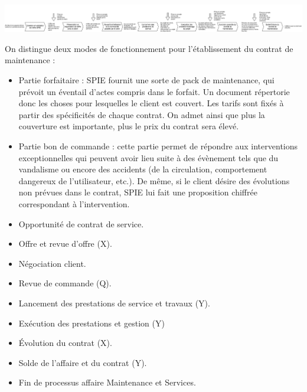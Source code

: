 \begin {center}
\includegraphics[width=\textwidth]{png/SimplificationProcessusDeMaintenanceSPIE.png}
\end {center}

On distingue deux modes de fonctionnement pour l’établissement du contrat de maintenance :

\begin{itemize}
\item Partie forfaitaire : SPIE fournit une sorte de pack de maintenance, qui prévoit un éventail d’actes compris dans le forfait. Un document répertorie donc les choses pour lesquelles le client est couvert. Les tarifs sont fixés à partir des spécificités de chaque contrat. On admet ainsi que plus la couverture est importante, plus le prix du contrat sera élevé. 
\item Partie bon de commande : cette partie permet de répondre aux interventions exceptionnelles qui peuvent avoir lieu suite à des évènement tels que du vandalisme ou encore des accidents (de la circulation, comportement dangereux de l’utilisateur, etc.). De même, si le client désire des évolutions non prévues dans le contrat, SPIE lui fait une proposition chiffrée correspondant à l'intervention.
\end{itemize}


\begin{itemize}
\item Opportunité de contrat de service.
\item Offre et revue d’offre (X).
\item Négociation client.
\item Revue de commande (Q).
\item Lancement des prestations de service et travaux (Y).
\item Exécution des prestations et gestion (Y)%
\item Évolution du contrat (X).
\item Solde de l’affaire et du contrat (Y).
\item Fin de processus affaire Maintenance et Services.
\end{itemize}

